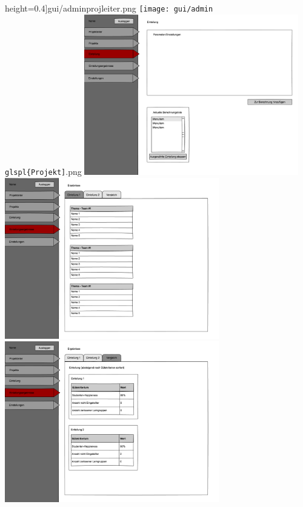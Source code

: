 \documentclass[parskip=full]{scrartcl}
\begin{document}
\begin{enumerate}
{height=0.4\textheight]{gui/adminprojleiter.png}
\medskip
\texttt{[image: gui/admin\\glspl\{Projekt]}.png}
\medskip
\includegraphics[width=0.7\textwidth,
height=0.4\textheight]{gui/admineinteilung.png}
\medskip
\includegraphics[width=0.7\textwidth,
height=0.4\textheight]{gui/adminergebnisse.png}
\medskip
\includegraphics[width=0.7\textwidth,
height=0.4\textheight]{gui/adminergebnissevergl.png}

\end{enumerate}
\end{document}
